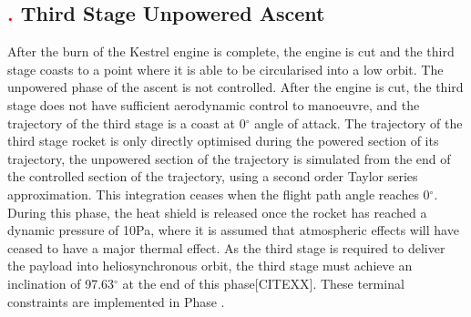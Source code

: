 \subsection{\textcolor{red}{.} Third Stage Unpowered Ascent}
After the burn of the Kestrel engine is complete, the engine is cut and the third stage coasts to a point where it is able to be circularised into a low orbit. 
The unpowered phase of the ascent is not controlled. After the engine is cut, the third stage does not have sufficient aerodynamic control to manoeuvre, and the trajectory of the third stage is a coast at 0$^\circ$ angle of attack. The trajectory of the third stage rocket is only directly optimised during the powered section of its trajectory, the unpowered section of the trajectory is simulated from the end of the controlled section of the trajectory, using a second order Taylor series approximation. This integration ceases when the flight path angle reaches 0$^{\circ}$.
During this phase, the heat shield is released once the rocket has reached a dynamic pressure of 10Pa, where it is assumed that atmospheric effects will have ceased to have a major thermal effect.  As the third stage is required to deliver the payload into heliosynchronous orbit, the third stage must achieve an inclination of 97.63$^\circ$ at the end of this phase[CITEXX]. These terminal constraints are implemented in Phase .



